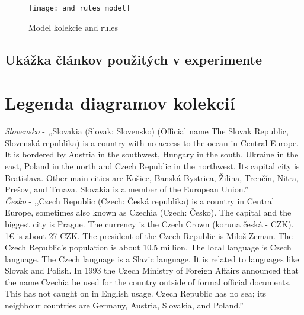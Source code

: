\begin{figure}[H]
	\begin{center}\texttt{[image: and\_rules\_model]}\end{center}
	\caption[Model kolekcie and rules]{Model kolekcie and rules}\label{fig:and_rules_collection_model}
\end{figure}

\newpage
{}
{
	\section{Ukážka článkov použitých v experimente}
}
{
	\chapter{Legenda diagramov kolekcií}
}
\textit{Slovensko} - ,,Slovakia (Slovak: Slovensko) (Official name The Slovak Republic, Slovenská republika) is a country with no access to the ocean in Central Europe. It is bordered by Austria in the southwest, Hungary in the south, Ukraine in the east, Poland in the north and Czech Republic in the northwest. Its capital city is Bratislava. Other main cities are Košice, Banská Bystrica, Žilina, Trenčín, Nitra, Prešov, and Trnava. Slovakia is a member of the European Union.'' \\

\noindent
\textit{Česko} - ,,Czech Republic (Czech: Česká republika) is a country in Central Europe, sometimes also known as Czechia (Czech: Česko). The capital and the biggest city is Prague. The currency is the Czech Crown (koruna česká - CZK). 1€ is about 27 CZK. The president of the Czech Republic is Miloš Zeman. The Czech Republic's population is about 10.5 million. The local language is Czech language. The Czech language is a Slavic language. It is related to languages like Slovak and Polish. In 1993 the Czech Ministry of Foreign Affairs announced that the name Czechia be used for the country outside of formal official documents. This has not caught on in English usage. Czech Republic has no sea; its neighbour countries are Germany, Austria, Slovakia, and Poland.'' \\


